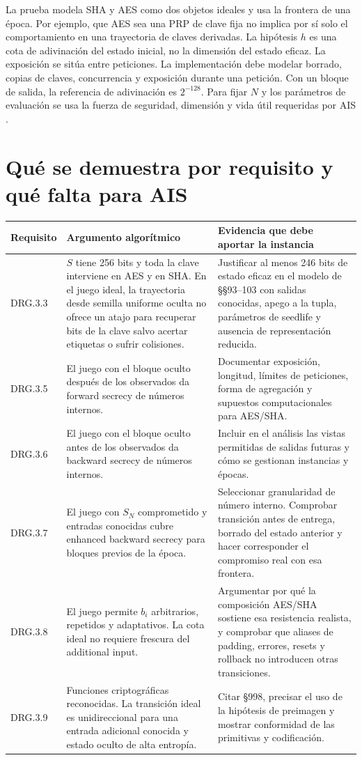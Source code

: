 \documentclass[11pt,a4paper]{article}
\begin{document}
La prueba modela SHA y AES como dos objetos ideales y usa la
frontera de una época. Por ejemplo, que AES sea una PRP de clave
fija no implica por sí solo el comportamiento en una trayectoria
de claves derivadas. La hipótesis $h$ es una cota de
adivinación del estado inicial, no la dimensión del estado
eficaz. La exposición se sitúa entre peticiones. La
implementación debe modelar borrado, copias de claves,
concurrencia y exposición durante una petición. Con un bloque
de salida, la referencia de adivinación es $2^{-128}$.
Para fijar $N$ y los parámetros de evaluación se usa la
fuerza de seguridad, dimensión y vida útil requeridas por AIS
\cite[§§93--103, 106--125, 195--198 y 211--214]{ais}.

\section{Qué se demuestra por requisito y qué falta para AIS}

\noindent\small
\begin{tabularx}{\linewidth}{@{}lYY@{}}
\toprule
Requisito & Argumento algorítmico & Evidencia que debe aportar la instancia\\
\midrule
DRG.3.3 &
$S$ tiene 256 bits y toda la clave interviene en AES y en SHA.
En el juego ideal, la trayectoria desde semilla uniforme oculta
no ofrece un atajo para recuperar bits de la clave salvo
acertar etiquetas o sufrir colisiones. &
Justificar al menos 246 bits de estado eficaz en el modelo de
§§93--103 con salidas conocidas, apego a la tupla, parámetros
de seedlife y ausencia de representación reducida. \\
DRG.3.5 &
El juego con el bloque oculto después de los observados
da forward secrecy de números internos. &
Documentar exposición, longitud, límites de peticiones, forma
de agregación y supuestos computacionales para AES/SHA.\\
DRG.3.6 &
El juego con el bloque oculto antes de los observados
da backward secrecy de números internos. &
Incluir en el análisis las vistas permitidas de salidas futuras
y cómo se gestionan instancias y épocas.\\
DRG.3.7 &
El juego con $S_N$ comprometido y entradas conocidas cubre
enhanced backward secrecy para bloques previos de la época. &
Seleccionar granularidad de número interno. Comprobar
transición antes de entrega, borrado del estado anterior
y hacer corresponder el compromiso real con esa frontera.\\
DRG.3.8 &
El juego permite $b_i$ arbitrarios, repetidos y adaptativos.
La cota ideal no requiere frescura del additional input. &
Argumentar por qué la composición AES/SHA sostiene esa
resistencia realista, y comprobar que aliases de padding,
errores, resets y rollback no introducen otras transiciones.\\
DRG.3.9 &
Funciones criptográficas reconocidas. La transición ideal
es unidireccional para una entrada adicional conocida y
estado oculto de alta entropía. &
Citar §998, precisar el uso de la hipótesis de preimagen y
mostrar conformidad de las primitivas y codificación.\\
\bottomrule
\end{tabularx}
\normalsize
\end{document}
